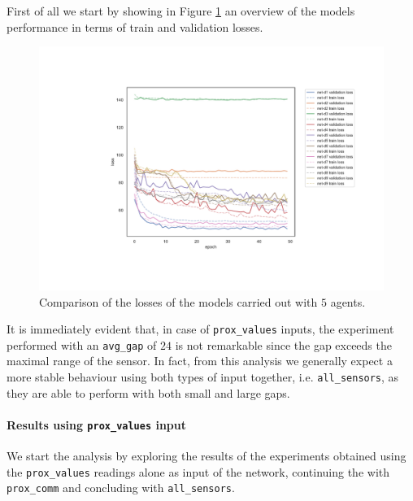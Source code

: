First of all we start by showing in Figure \ref{fig:distloss} an overview of the 
models performance in terms of train and validation losses. 
\begin{figure}[!htb]
	\centering
	\includegraphics[width=.85\textwidth]{contents/images/task1/loss-distributed-all@}%
	\caption[Comparison of losses of the first set of 
	experiments.]{Comparison of 
	the losses of the models carried out with $5$ agents.}
	\label{fig:distloss}
\end{figure}
It is immediately evident that, in case of \texttt{prox\_values} inputs, the 
experiment performed with an \texttt{avg\_gap} of $24$ is not remarkable since 
the gap exceeds the maximal range of the sensor. In fact, from this analysis we 
generally expect a more stable behaviour using both types of input together, i.e. 
\texttt{all\_sensors}, as they are able to perform with both small and large gaps.

\paragraph*{Results using \texttt{prox\_values} input}
\label{para:1}
We start the analysis by exploring the results of the experiments obtained 
using the \texttt{prox\_values} readings alone as input of the network, continuing 
the with \texttt{prox\_comm} and concluding with \texttt{all\_sensors}.


